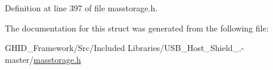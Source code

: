 \-Definition at line 397 of file masstorage.\-h.



\-The documentation for this struct was generated from the following file\-:\begin{DoxyCompactItemize}
\item 
\-G\-H\-I\-D\-\_\-\-Framework/\-Src/\-Included Libraries/\-U\-S\-B\-\_\-\-Host\-\_\-\-Shield\-\_.-\/master/\hyperlink{masstorage_8h}{masstorage.\-h}\end{DoxyCompactItemize}
